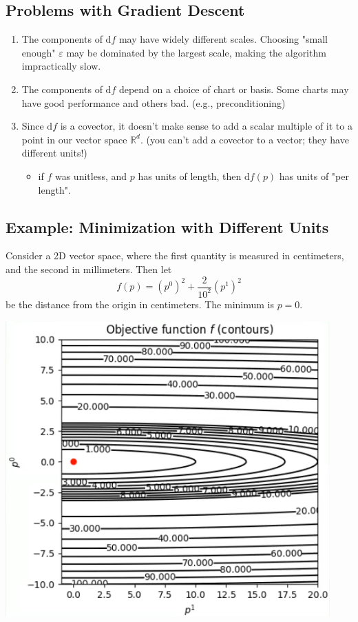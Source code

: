 \documentclass[10pt]{article}
\newcommand{\R}{\mathbb{R}}
\newcommand{\dd}{\text{d}}
\begin{document}
\subsection*{Problems with Gradient Descent}
\begin{enumerate}
    \item The components of $\dd f$ may have widely different scales.  Choosing "small enough" $\varepsilon$ may be dominated by the largest scale, making the algorithm impractically slow.
    \item The components of $\dd f$ depend on a choice of chart or basis.  Some charts may have good performance and others bad.  (e.g., preconditioning)
    \item Since $\dd f$ is a covector, it doesn't make sense to add a scalar multiple of it to a point in our vector space $\R^d$.  (you can't add a covector to a vector; they have different units!)
    \begin{itemize}
        \item if $f$ was unitless, and $p$ has units of length, then $\dd f(p)$ has units of "per length".
    \end{itemize}
\end{enumerate}

\subsection*{Example: Minimization with Different Units}
Consider a 2D vector space, where the first quantity is measured in centimeters, and the second in millimeters.  Then let 
\[f(p) = (p^0)^2 + \frac{2}{10^2} (p^1)^2\]
be the distance from the origin in centimeters.  The minimum is $p = 0$.
\begin{center} 
	\includegraphics*[scale=0.8]{W8_3.png} 
\end{center}
\end{document}
